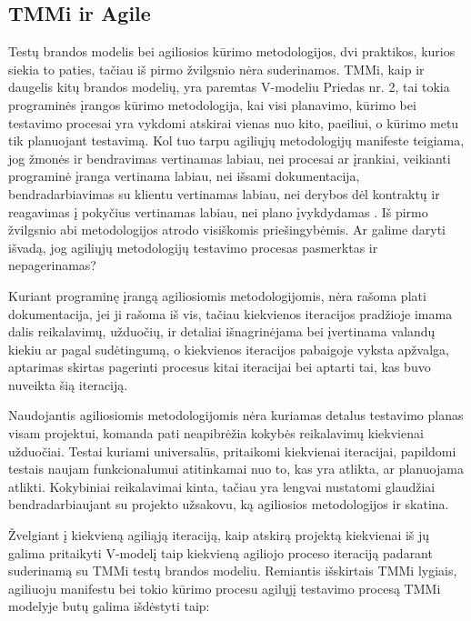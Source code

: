 \documentclass{VUMIFPSkursinis}
\begin{document}
\subsection{TMMi ir Agile}
Testų brandos modelis bei agiliosios kūrimo metodologijos, dvi praktikos, kurios siekia to paties, tačiau iš pirmo žvilgsnio nėra suderinamos. TMMi, kaip ir daugelis kitų brandos modelių, yra paremtas V-modeliu Priedas nr. 2, tai tokia programinės įrangos kūrimo metodologija, kai visi planavimo, kūrimo bei testavimo procesai yra vykdomi atskirai vienas nuo kito, paeiliui, o kūrimo metu tik planuojant testavimą. Kol tuo tarpu agiliųjų metodologijų manifeste teigiama, jog žmonės ir bendravimas vertinamas labiau, nei procesai ar įrankiai, veikianti programinė įranga vertinama labiau, nei išsami dokumentacija, bendradarbiavimas su klientu vertinamas labiau, nei derybos dėl kontraktų ir reagavimas į pokyčius vertinamas labiau, nei plano įvykdydamas \cite{agile}. Iš pirmo žvilgsnio abi metodologijos atrodo visiškomis priešingybėmis. Ar galime daryti išvadą, jog agiliųjų metodologijų testavimo procesas pasmerktas ir nepagerinamas?

Kuriant programinę įrangą agiliosiomis metodologijomis, nėra rašoma plati dokumentacija, jei ji rašoma iš vis, tačiau kiekvienos iteracijos pradžioje imama dalis reikalavimų, užduočių, ir detaliai išnagrinėjama bei įvertinama valandų kiekiu ar pagal sudėtingumą, o kiekvienos iteracijos pabaigoje vyksta apžvalga, aptarimas skirtas pagerinti procesus kitai iteracijai bei aptarti tai, kas buvo nuveikta šią iteraciją.

Naudojantis agiliosiomis metodologijomis nėra kuriamas detalus testavimo planas visam projektui, komanda pati neapibrėžia kokybės reikalavimų kiekvienai užduočiai. Testai kuriami universalūs, pritaikomi kiekvienai iteracijai, papildomi testais naujam funkcionalumui atitinkamai nuo to, kas yra atlikta, ar planuojama atlikti. Kokybiniai reikalavimai kinta, tačiau yra lengvai nustatomi glaudžiai bendradarbiaujant su projekto užsakovu, ką agiliosios metodologijos ir skatina.

Žvelgiant į kiekvieną agiliąją iteraciją, kaip atskirą projektą kiekvienai iš jų galima pritaikyti V-modelį taip kiekvieną agiliojo proceso iteraciją padarant suderinamą su TMMi testų brandos modeliu. Remiantis išskirtais TMMi lygiais, agiliuoju manifestu bei tokio kūrimo procesu agilųjį testavimo procesą TMMi modelyje butų galima išdėstyti taip:
\end{document}

